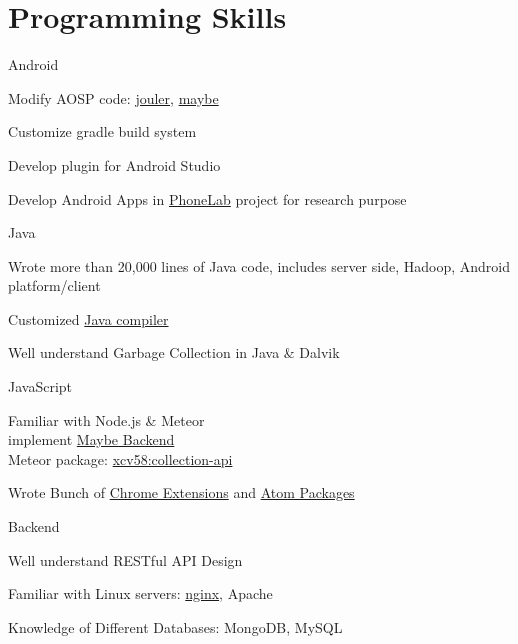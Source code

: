 

\section{Programming Skills}
\cvcomputer
{Android}{
\begin{tightitemize}
  \item Modify AOSP code:
  \href{http://platform.phone-lab.org:8080/gitweb?p=platform/frameworks/base.git;a=search;h=refs/heads/experiment/1/jouler;s=Yihong+Chen;st=author}{jouler},
  \href{http://platform.phone-lab.org:8080/gitweb?p=platform/frameworks/base.git;a=search;h=refs/heads/experiment/3/maybe;s=Yihong+Chen;st=author}{maybe}
  \item Customize gradle build system
  \item Develop plugin for Android Studio
  \item Develop Android Apps in
  \href{https://phone-lab.org/}{PhoneLab} project for research purpose
\end{tightitemize}
}
{Java}{
\begin{tightitemize}
  \item Wrote more than 20,000 lines of Java code, includes server side, Hadoop, Android platform/client
  \item Customized \href{https://github.com/blue-systems-group/project.maybe.polyglot}{Java compiler}
  \item Well understand Garbage Collection in Java \& Dalvik
\end{tightitemize}
}

\cvcomputer
{JavaScript}{
\begin{tightitemize}
  \item Familiar with Node.js \& Meteor
  \\implement \href{https://maybe.xcv58.me}{Maybe Backend}
  \\Meteor package:
  \href{https://atmospherejs.com/xcv58/collection-api}{xcv58:collection-api}
  \item Wrote Bunch of \href{https://chrome.google.com/webstore/search/xcv58?hl=en}{Chrome Extensions} and
  \href{https://atom.io/users/xcv58}{Atom Packages}
\end{tightitemize}
}
{Backend}{
\begin{tightitemize}
  \item Well understand RESTful API Design
  \item Familiar with Linux servers:
  \href{https://github.com/xcv58/nginx-config}{nginx}, Apache
  \item Knowledge of Different Databases: MongoDB, MySQL
\end{tightitemize}
}

